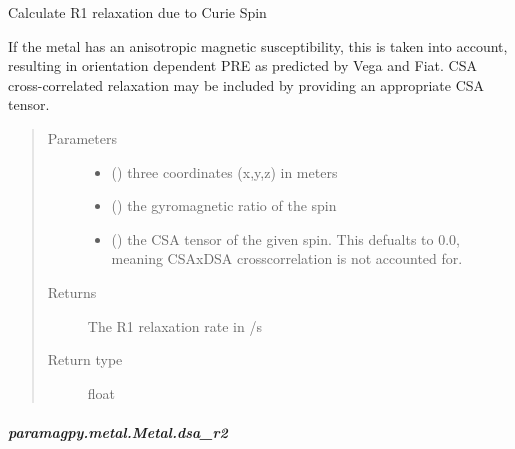 \documentclass[a4paper,10pt,english,openany,oneside]{sphinxmanual}
\begin{document}
\begin{fulllineitems}
\begin{fulllineitems}
\begin{fulllineitems}
\label{\detokenize{reference/generated/paramagpy.metal.Metal.dsa_r1:paramagpy.metal.Metal.dsa_r1}}
Calculate R1 relaxation due to Curie Spin

If the metal has an anisotropic magnetic susceptibility, this is
taken into account, resulting in orientation dependent PRE as
predicted by Vega and Fiat. CSA cross-correlated relaxation may
be included by providing an appropriate CSA tensor.
\begin{quote}\begin{description}
\item[{Parameters}] \leavevmode\begin{itemize}
\item {} 
 () \textendash{} three coordinates (x,y,z) in meters

\item {} 
 () \textendash{} the gyromagnetic ratio of the spin

\item {} 
 (\sphinxstyleliteralemphasis{\sphinxupquote{ (}}\sphinxstyleliteralemphasis{\sphinxupquote{)}}) \textendash{} the CSA tensor of the given spin.
This defualts to 0.0, meaning CSAxDSA crosscorrelation is
not accounted for.

\end{itemize}

\item[{Returns}] \leavevmode
{} \textendash{} The R1 relaxation rate in /s

\item[{Return type}] \leavevmode
float

\end{description}\end{quote}

\end{fulllineitems}



\subparagraph{paramagpy.metal.Metal.dsa\_r2}
\label{\detokenize{reference/generated/paramagpy.metal.Metal.dsa_r2:paramagpy-metal-metal-dsa-r2}}\label{\detokenize{reference/generated/paramagpy.metal.Metal.dsa_r2::doc}}


\end{fulllineitems}
\end{fulllineitems}
\end{document}
